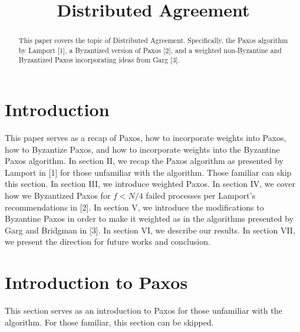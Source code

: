 \documentclass[conference]{IEEEtran}
\begin{document}
\title{Distributed Agreement\\
}

\author{
\and
{}
}

\maketitle

\begin{abstract}
This paper covers the topic of Distributed Agreement. Specifically, the Paxos algorithm by Lamport [1], a Byzantized version of Paxos [2], and a weighted non-Byzantine and Byzantized Paxos incorporating ideas from Garg [3].
\end{abstract}

\section{Introduction}
This paper serves as a recap of Paxos, how to incorporate weights into Paxos, how to Byzantize Paxos, and how to incorporate weights into the Byzantine Paxos algorithm. In section II, we recap the Paxos algorithm as presented by Lamport in [1] for those unfamiliar with the algorithm. Those familiar can skip this section. In section III, we introduce weighted Paxos. In section IV, we cover how we Byzantized Paxos for $f < N/4$ failed processes per Lamport's recommendations in [2]. In section V, we introduce the modifications to Byzantine Paxos in order to make it weighted as in the algorithms presented by Garg and Bridgman in [3]. In section VI, we describe our results. In section VII, we present the direction for future works and conclusion.

\section{Introduction to Paxos}
This section serves as an introduction to Paxos for those unfamiliar with the algorithm. For those familiar, this section can be skipped.
\end{document}
